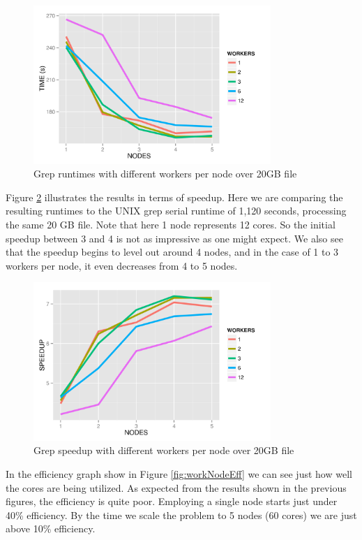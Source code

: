 \documentclass{article}
\begin{document}
    \begin{figure}[H]
        \centering
        \includegraphics[width=90mm]{images/workerPerNodeTimes.png}
        \caption{Grep runtimes with different workers per node over 20GB file}
        \label{fig:workNodeTime}
    \end{figure}

Figure \ref{fig:workNodeSpeed} illustrates the results in terms of speedup.
Here we are comparing the resulting runtimes to the UNIX grep serial runtime of
1,120 seconds, processing the same 20 GB file. Note that here 1 node represents
12 cores. So the initial speedup between 3 and 4 is not as impressive as one
might expect. We also see that the speedup begins to level out around 4 nodes,
and in the case of 1 to 3 workers per node, it even decreases from 4 to 5
nodes.

    \begin{figure}[H]
        \centering
        \includegraphics[width=90mm]{images/workerPerNodeSpeedup.png}
        \caption{Grep speedup with different workers per node over 20GB file}
        \label{fig:workNodeSpeed}
    \end{figure}

In the efficiency graph show in Figure \ref{fig:workNodeEff} we can see just
how well the cores are being utilized. As expected from the results shown in
the previous figures, the efficiency is quite poor. Employing a single node
starts just under 40\% efficiency. By the time we scale the problem to 5 nodes
(60 cores) we are just above 10\% efficiency.
\end{document}
